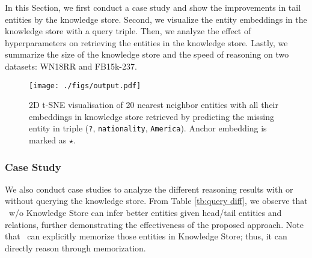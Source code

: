 \documentclass[runningheads]{llncs}
\begin{document}
In this Section, we first conduct a case study and show the improvements in tail entities by the knowledge store.
Second, we visualize the entity embeddings in the knowledge store with a query triple.
Then, we analyze the effect of hyperparameters on retrieving the entities in the knowledge store.
Lastly, we summarize the size of the knowledge store and the speed of reasoning on two datasets: WN18RR and FB15k-237.

\begin{figure}[!htb] \centering \texttt{[image: ./figs/output.pdf]} \caption{2D t-SNE visualisation of 20 nearest neighbor entities with all their embeddings in knowledge store retrieved by predicting the missing entity in triple (\texttt{?}, \texttt{nationality}, \texttt{America}).
Anchor embedding is marked as $\star$.} 
\label{fig:visualization}
\end{figure} 

\subsubsection{\textbf{Case Study}}
We also conduct case studies to analyze the different reasoning results with or without querying the knowledge store. 
From Table \ref{tb:query diff}, we observe that \ours~w/o Knowledge Store can infer better entities given head/tail entities and relations, further demonstrating the effectiveness of the proposed approach.
Note that \ours~can explicitly memorize those entities in Knowledge Store; thus, it can directly reason through memorization.


\begin{table}[!htb]

\centering
\caption{First five entities with their probability predicted by \ours~w/o Knowledge Store, and its reranking with \ours, for two example queries.}

\label{tb:query diff}
\end{table} 
\end{document}
